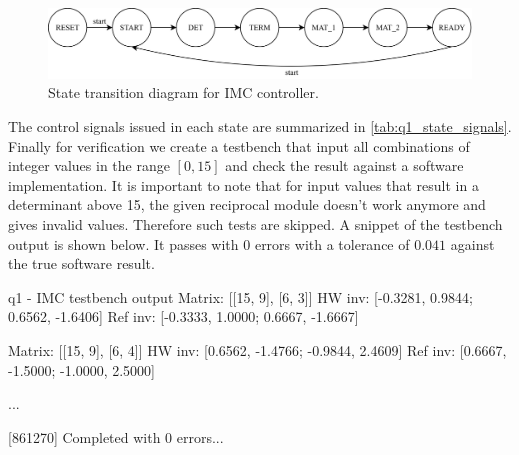 \documentclass[../main.tex]{subfiles}
\begin{document}
\vspace{-10pt}
\begin{figure}[h]
    \centering
    \includegraphics[width=\linewidth]{assets/q1_state.png}
    \caption{State transition diagram for IMC controller.}
    \label{fig:q1_controller}
\end{figure}

The control signals issued in each state are summarized in \cref{tab:q1_state_signals}. Finally for verification we create a testbench that input all combinations of integer values in the range $[0, 15]$ and check the result against a software implementation. It is important to note that for input values that result in a determinant above 15, the given reciprocal module doesn't work anymore and gives invalid values. Therefore such tests are skipped. A snippet of the testbench output is shown below. It passes with 0 errors with a tolerance of $0.041$ against the true software result.

\begin{textcode}{q1 - IMC testbench output}
Matrix: [[15, 9], [6, 3]]
HW inv: [-0.3281, 0.9844; 0.6562, -1.6406]
Ref inv: [-0.3333, 1.0000; 0.6667, -1.6667]

Matrix: [[15, 9], [6, 4]]
HW inv: [0.6562, -1.4766; -0.9844, 2.4609]
Ref inv: [0.6667, -1.5000; -1.0000, 2.5000]

...

[861270] Completed with 0 errors...
\end{textcode}

\newpage
\end{document}
